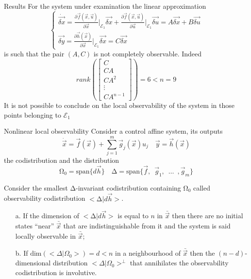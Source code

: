 \begin{frame}{Results}
  For the system under examination the linear approximation
  \[
  \begin{cases}
    \dot{\vec{\delta x}} = \frac{\partial{\vec{f}(\vec{x},\vec{u})}}{\partial{\vec{x}}}\Big|_{\mathcal{E}_1} \vec{\delta x} +
    \frac{\partial{\vec{f}(\vec{x},\vec{u})}}{\partial{\vec{u}}}\Big|_{\mathcal{E}_1} \vec{\delta u} = A \vec{\delta x} + B \vec{\delta u}\\
    \vec{\delta y} = \frac{\partial{\vec{h}(\vec{x})}}{\partial{\vec{x}}}\Big|_{\mathcal{E}_1} \vec{\delta x}= C \vec{\delta x}
  \end{cases}
  \]
  is such that the pair $(A, C)$ is not completely observable. Indeed
  \[
  rank\left(
  \begin{bmatrix}
    C \\ CA \\ CA^2 \\ \vdots \\ CA^{n-1}
  \end{bmatrix}
  \right) = 6 < n = 9
  \]
  It is not possible to conclude on the local observability of the system
  in those points belonging to $\mathcal{E}_1$
\end{frame}

\begin{frame}{Nonlinear local observability}
  \small
  Consider a control affine system, its outputs
  \[
    \dot{\vec{x}} = \vec{f}(\vec{x}) + \sum\limits_{j=1}^{m}\vec{g}_j(\vec{x}) u_{j} \quad \vec{y} = \vec{h}(\vec{x})
  \]
  the codistribution and the distribution
  \[
  \mathrm{\Omega}_0 = \mathrm{span} \{ d \vec{h}\} \quad \mathrm{\Delta}= \mathrm{span} \{\vec{f},\enspace\vec{g}_1, \enspace \hdots \enspace, \vec{g}_m\}
  \]
  \begin{theorem}
    Consider the smallest $\mathrm{\Delta}$-invariant codistribution containing $\mathrm{\Omega}_0$ called
    observability codistribution $< \mathrm{\Delta} | d\vec{h} >$.
    \begin{itemize}
    \item[a.]If the dimension of $< \mathrm{\Delta}|d\vec{h} >$ is equal to $n$ in $\bar{\vec{x}}$ then
      there are no initial states ``near'' $\bar{\vec{x}}$ that are indistinguishable from
      it and the system is said locally observable in $\bar{\vec{x}}$;
    \item[b.]If $\text{dim}(< \Delta|\Omega_0 >) = d < n$ in a neighbourhood of $\bar{\vec{x}}$ then
      the $(n-d)$-dimensional distribution $< \Delta|\Omega_0 >^{\perp}$ that annihilates
      the observability codistribution is involutive.
    \end{itemize}
  \end{theorem}
\end{frame}

